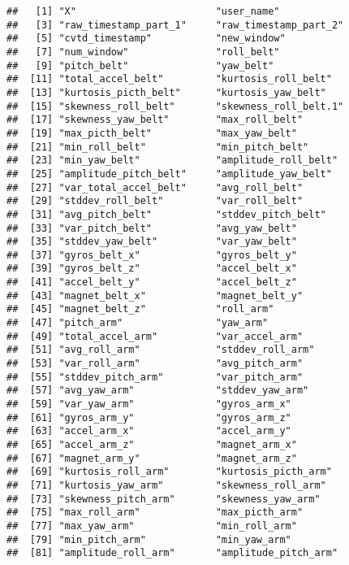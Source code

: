 \documentclass[]{article}
\begin{document}
\begin{verbatim}
##   [1] "X"                        "user_name"               
##   [3] "raw_timestamp_part_1"     "raw_timestamp_part_2"    
##   [5] "cvtd_timestamp"           "new_window"              
##   [7] "num_window"               "roll_belt"               
##   [9] "pitch_belt"               "yaw_belt"                
##  [11] "total_accel_belt"         "kurtosis_roll_belt"      
##  [13] "kurtosis_picth_belt"      "kurtosis_yaw_belt"       
##  [15] "skewness_roll_belt"       "skewness_roll_belt.1"    
##  [17] "skewness_yaw_belt"        "max_roll_belt"           
##  [19] "max_picth_belt"           "max_yaw_belt"            
##  [21] "min_roll_belt"            "min_pitch_belt"          
##  [23] "min_yaw_belt"             "amplitude_roll_belt"     
##  [25] "amplitude_pitch_belt"     "amplitude_yaw_belt"      
##  [27] "var_total_accel_belt"     "avg_roll_belt"           
##  [29] "stddev_roll_belt"         "var_roll_belt"           
##  [31] "avg_pitch_belt"           "stddev_pitch_belt"       
##  [33] "var_pitch_belt"           "avg_yaw_belt"            
##  [35] "stddev_yaw_belt"          "var_yaw_belt"            
##  [37] "gyros_belt_x"             "gyros_belt_y"            
##  [39] "gyros_belt_z"             "accel_belt_x"            
##  [41] "accel_belt_y"             "accel_belt_z"            
##  [43] "magnet_belt_x"            "magnet_belt_y"           
##  [45] "magnet_belt_z"            "roll_arm"                
##  [47] "pitch_arm"                "yaw_arm"                 
##  [49] "total_accel_arm"          "var_accel_arm"           
##  [51] "avg_roll_arm"             "stddev_roll_arm"         
##  [53] "var_roll_arm"             "avg_pitch_arm"           
##  [55] "stddev_pitch_arm"         "var_pitch_arm"           
##  [57] "avg_yaw_arm"              "stddev_yaw_arm"          
##  [59] "var_yaw_arm"              "gyros_arm_x"             
##  [61] "gyros_arm_y"              "gyros_arm_z"             
##  [63] "accel_arm_x"              "accel_arm_y"             
##  [65] "accel_arm_z"              "magnet_arm_x"            
##  [67] "magnet_arm_y"             "magnet_arm_z"            
##  [69] "kurtosis_roll_arm"        "kurtosis_picth_arm"      
##  [71] "kurtosis_yaw_arm"         "skewness_roll_arm"       
##  [73] "skewness_pitch_arm"       "skewness_yaw_arm"        
##  [75] "max_roll_arm"             "max_picth_arm"           
##  [77] "max_yaw_arm"              "min_roll_arm"            
##  [79] "min_pitch_arm"            "min_yaw_arm"             
##  [81] "amplitude_roll_arm"       "amplitude_pitch_arm"     

\end{verbatim}
\end{document}

